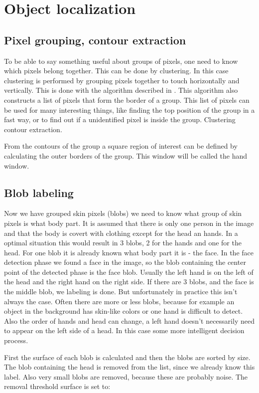 \section{Object localization}

\subsection*{Pixel grouping, contour extraction}
To be able to say something useful about groups of pixels, one need to know which pixels belong together. This can be done by clustering. In this case clustering is performed by grouping pixels together to touch horizontally and vertically. This is done with the algorithm described in \cite{Suzuki85}. This algorithm also constructs a list of pixels that form the border of a group. This list of pixels can be used for many interesting things, like finding the top position of the group in a fast way, or to find out if a unidentified pixel is inside the group. Clustering contour extraction\cite{Suzuki85}.

From the contours of the group a square region of interest can be defined by calculating the outer borders of the group. This window will be called the hand window.

\subsection*{Blob labeling}
Now we have grouped skin pixels (blobs) we need to know what group of skin pixels is what body part. It is assumed that there is only one person in the image and that the body is covert with clothing except for the head an hands. In a optimal situation this would result in 3 blobs, 2 for the hands and one for the head. For one blob it is already known what body part it is - the face. In the face detection phase we found a face in the image, so the blob containing the center point of the detected phase is the face blob. Usually the left hand is on the left of the head and the right hand on the right side. If there are 3 blobs, and the face is the middle blob, we labeling is done. But unfortunately in practice this isn't always the case. Often there are more or less blobs, because for example an object in the background has skin-like colors or one hand is difficult to detect. Also the order of hands and head can change, a left hand doesn't necessarily need to appear on the left side of a head. In this case some more intelligent decision process. 

First the surface of each blob is calculated and then the blobs are sorted by size. The blob containing the head is removed from the list, since we already know this label. Also very small blobs are removed, because these are probably noise. The removal threshold surface is set to:

